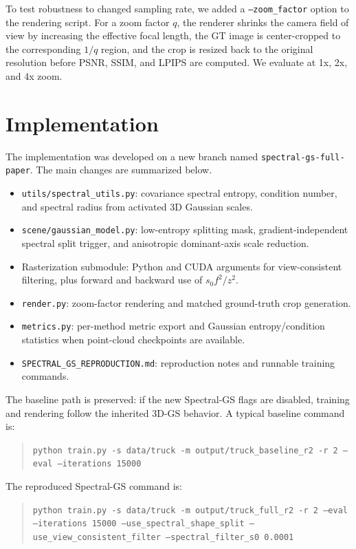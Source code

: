 \documentclass{article}
\begin{document}
To test robustness to changed sampling rate, we added a \texttt{--zoom\_factor} option to the rendering script. For a zoom factor $q$, the renderer shrinks the camera field of view by increasing the effective focal length, the GT image is center-cropped to the corresponding $1/q$ region, and the crop is resized back to the original resolution before PSNR, SSIM, and LPIPS are computed. We evaluate at 1x, 2x, and 4x zoom.

\section{Implementation}
\label{sec:implementation}

The implementation was developed on a new branch named \texttt{spectral-gs-full-paper}. The main changes are summarized below.

\begin{itemize}
    \item \texttt{utils/spectral\_utils.py}: covariance spectral entropy, condition number, and spectral radius from activated 3D Gaussian scales.
    \item \texttt{scene/gaussian\_model.py}: low-entropy splitting mask, gradient-independent spectral split trigger, and anisotropic dominant-axis scale reduction.
    \item Rasterization submodule: Python and CUDA arguments for view-consistent filtering, plus forward and backward use of $s_0 f^2/z^2$.
    \item \texttt{render.py}: zoom-factor rendering and matched ground-truth crop generation.
    \item \texttt{metrics.py}: per-method metric export and Gaussian entropy/condition statistics when point-cloud checkpoints are available.
    \item \texttt{SPECTRAL\_GS\_REPRODUCTION.md}: reproduction notes and runnable training commands.
\end{itemize}

The baseline path is preserved: if the new Spectral-GS flags are disabled, training and rendering follow the inherited 3D-GS behavior. A typical baseline command is:
\begin{quote}
\small
\texttt{python train.py -s data/truck -m output/truck\_baseline\_r2 -r 2 --eval --iterations 15000}
\end{quote}
The reproduced Spectral-GS command is:
\begin{quote}
\small
\texttt{python train.py -s data/truck -m output/truck\_full\_r2 -r 2 --eval --iterations 15000 --use\_spectral\_shape\_split --use\_view\_consistent\_filter --spectral\_filter\_s0 0.0001}
\end{quote}
\end{document}
